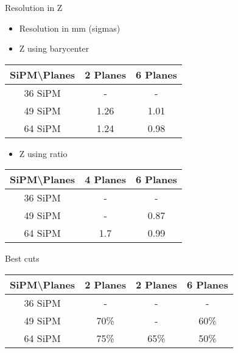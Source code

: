 \documentclass{beamer}
\begin{document}
\begin{frame}{Resolution in Z}
\begin{center}
\begin{itemize}
\item Resolution in mm (sigmas)
\item Z using barycenter
\vspace{0.5 cm}
\end{itemize}
 \begin{tabular}{c|cc|}
  \toprule
  SiPM\textbackslash Planes & \textbf{2 Planes} & \textbf{6 Planes} \\
   \hline
  36 SiPM & - & -  \\
  49 SiPM & 1.26 & 1.01 \\
  64 SiPM & 1.24 & 0.98 \\
    \toprule
 \end{tabular}
 
 \begin{itemize}
 \item Z using ratio
 \vspace{0.5 cm}
 \end{itemize}
 
  \begin{tabular}{c|cc|}
   \toprule
   SiPM\textbackslash Planes & \textbf{4 Planes} & \textbf{6 Planes} \\
    \hline
   36 SiPM & - & -  \\
   49 SiPM & - & 0.87 \\
   64 SiPM & 1.7 & 0.99 \\
     \toprule
  \end{tabular}
\end{center}
\end{frame}


\begin{frame}{Best cuts}
\begin{center}
 \begin{tabular}{c|ccc|}
  \toprule
  SiPM\textbackslash Planes & \textbf{2 Planes} & \textbf{2 Planes} & \textbf{6 Planes} \\
   \hline
  36 SiPM & - & - & - \\
  49 SiPM & 70\% & - & 60\% \\
  64 SiPM & 75\% & 65\% & 50\% \\
    \toprule
 \end{tabular}
\end{center}
\end{frame}
\end{document}
